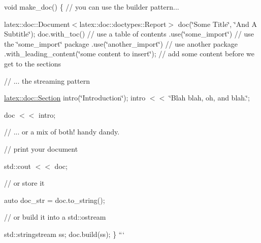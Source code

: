 void make\-\_\-doc() \{ // you can use the builder pattern...

latex\-::doc\-::\-Document$<$latex\-::doc\-::doctypes\-::\-Report$>$ doc(\char`\"{}\-Some Title\char`\"{}, \char`\"{}\-And A Subtitle\char`\"{}); doc.\-with\-\_\-toc() // use a table of contents .use(\char`\"{}some\-\_\-import\char`\"{}) // use the \char`\"{}some\-\_\-import\char`\"{} package .use(\char`\"{}another\-\_\-import\char`\"{}) // use another package .with\-\_\-leading\-\_\-content(\char`\"{}some content to insert\char`\"{}); // add some content before we get to the sections

// ... the streaming pattern

\hyperlink{classlatex_1_1doc_1_1Section}{latex\-::doc\-::\-Section} intro(\char`\"{}\-Introduction\char`\"{}); intro $<$$<$ \char`\"{}\-Blah blah, oh, and blah.\char`\"{};

doc $<$$<$ intro;

// ... or a mix of both! handy dandy.

// print your document

std\-::cout $<$$<$ doc;

// or store it

auto doc\-\_\-str = doc.\-to\-\_\-string();

// or build it into a std\-::ostream

std\-::stringstream ss; doc.\-build(ss); \} ``` 